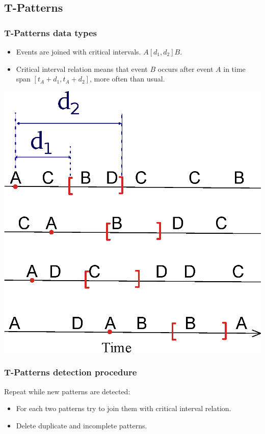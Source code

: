 \documentclass[smaller]{beamer}
\begin{document}
\subsection{ T-Patterns}
\begin{frame}
  \frametitle{T-Patterns data types}
\begin{itemize}
  \item Events are joined with critical intervals. $A[d_1,d_2]B$.
  \item Critical interval relation means that event $B$ occurs after 
	event $A$ in time span $[t_A + d_1, t_A + d_2 ]$, more often than usual.
\end{itemize}
  \begin{center}
      \includegraphics[scale=0.42]{TSCI.eps}
  \end{center}
\end{frame}

\begin{frame}
  \frametitle{T-Patterns detection procedure}
  Repeat while new patterns are detected:
\begin{itemize}
  \item For each two patterns try to join them with 
	critical interval relation.
  \item Delete duplicate and incomplete patterns.
\end{itemize}
\end{frame}
\end{document}
